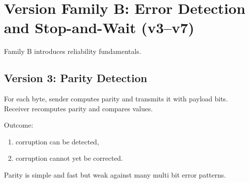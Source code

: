 \clearpage
\section{Version Family B: Error Detection and Stop-and-Wait (v3--v7)}
Family B introduces reliability fundamentals.
\subsection{Version 3: Parity Detection}
For each byte, sender computes parity and transmits it with payload bits.
Receiver recomputes parity and compares values.

Outcome:
\begin{enumerate}
    \item corruption can be detected,
    \item corruption cannot yet be corrected.
\end{enumerate}

Parity is simple and fast but weak against many multi bit error patterns.


